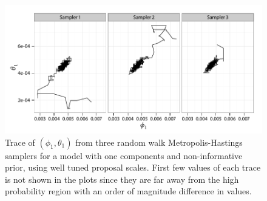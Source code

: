 \begin{figure}
  \linespread{1.1}\selectfont
  \includegraphics[width=\linewidth]{fig_src/PET_MH_Path.pdf}
  \caption[Trace of parameters in the random walk algorithm for the
  \protect\pet compartmental model (calibrated)]
  {Trace of $(\phi_1,\theta_1)$ from three random walk
    Metropolis-Hastings samplers for a \pet model with one components and
    non-informative prior, using well tuned proposal scales. First few values
    of each trace is not shown in the plots since they are far away from the
    high probability region with an order of magnitude difference in values.}
  \label{fig:pet mh tuned}
\end{figure}
